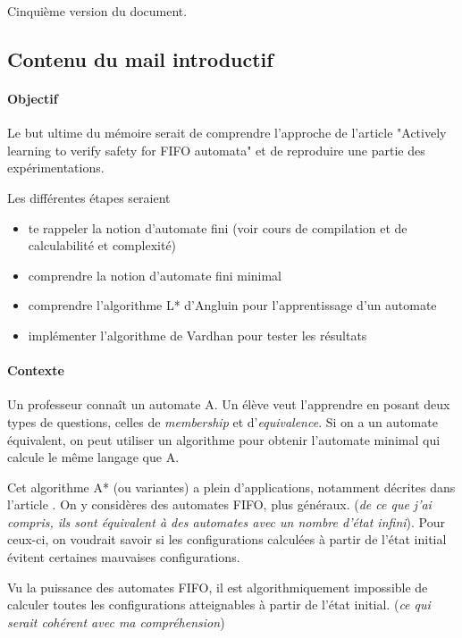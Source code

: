 Cinquième version du document.

\subsection*{Contenu du mail introductif}

\paragraph{Objectif}

Le but ultime du mémoire serait de comprendre l’approche de l’article "Actively learning to verify safety for FIFO automata" \cite{Vardhan04} et de reproduire une partie des expérimentations.

Les différentes étapes seraient
\begin{itemize}
	\item te rappeler la notion d’automate fini (voir cours de compilation et de calculabilité et complexité)
	\item comprendre la notion d’automate fini minimal
	\item comprendre l’algorithme L* d’Angluin pour l’apprentissage d’un automate
	\item implémenter l'algorithme de Vardhan pour tester les résultats
\end{itemize}


\paragraph{Contexte}

Un professeur connaît un automate A. Un élève veut l'apprendre en posant deux types de questions, celles de \emph{membership} et d'\emph{equivalence}. Si on a un automate équivalent, on peut utiliser un algorithme pour obtenir l'automate minimal qui calcule le même langage que A.

Cet algorithme A* (ou variantes) a plein d'applications, notamment décrites dans l'article \cite{Vardhan04}. On y considères des automates FIFO, plus généraux. (\emph{de ce que j'ai compris, ils sont équivalent à des automates avec un nombre d'état infini}). Pour ceux-ci, on voudrait savoir si les configurations calculées à partir de l’état initial évitent certaines mauvaises configurations.

Vu la puissance des automates FIFO, il est algorithmiquement impossible de calculer toutes les configurations atteignables à partir de l’état initial. (\emph{ce qui serait cohérent avec ma compréhension})

